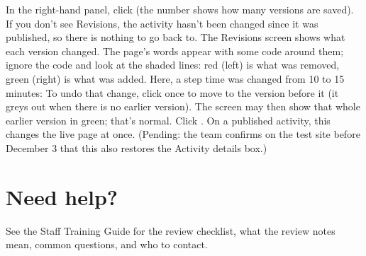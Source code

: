 In the right-hand panel, click  (the number shows how many versions are saved). If you don't see Revisions, the activity hasn't been changed since it was published, so there is nothing to go back to.
The Revisions screen shows what each version changed. The page's words appear with some code around them; ignore the code and look at the shaded lines: red (left) is what was removed, green (right) is what was added. Here, a step time was changed from 10 to 15 minutes:
To undo that change, click  once to move to the version before it (it greys out when there is no earlier version). The screen may then show that whole earlier version in green; that's normal. Click . On a published activity, this changes the live page at once. (Pending: the team confirms on the test site before December 3 that this also restores the Activity details box.)

\section*{Need help?}
See the Staff Training Guide for the review checklist, what the review notes mean, common questions, and who to contact.


